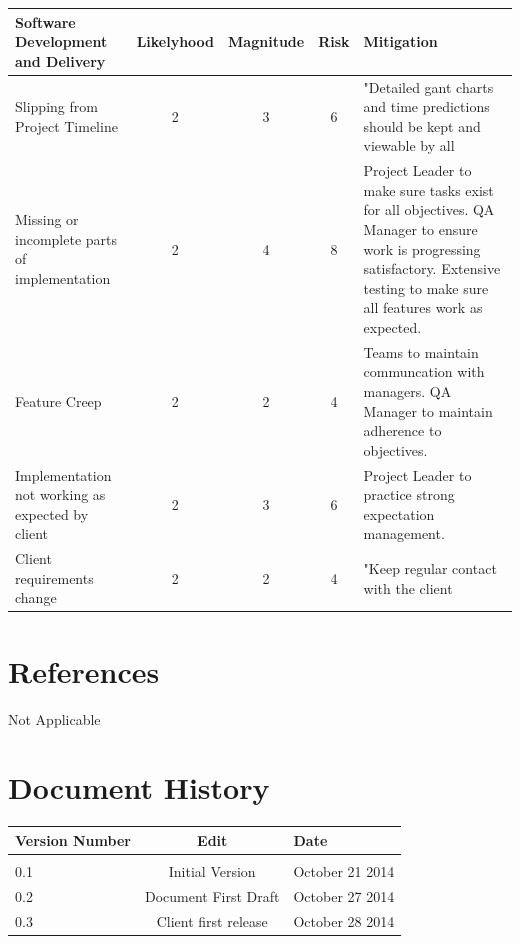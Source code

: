 \documentclass[11pt, titlepage]{article}
\begin{document}
\begin{tabular}[]{| p{3cm} | c | c | c | p{5cm} |}
\hline
\textbf{Software Development and Delivery}&\textbf{Likelyhood}&\textbf{Magnitude}&\textbf{Risk}&\textbf{Mitigation} \\ \hline \hline
Slipping from Project Timeline&2&3&6&"Detailed gant charts and time predictions should be kept and viewable by all\\ \hline
Missing or incomplete parts of implementation&2&4&8&Project Leader to make sure tasks exist for all objectives. QA Manager to ensure work is progressing satisfactory. Extensive testing to make sure all features work as expected. \\ \hline
Feature Creep&2&2&4&Teams to maintain communcation with managers. QA Manager to maintain adherence to objectives. \\ \hline
Implementation not working as expected by client&2&3&6&Project Leader to practice strong expectation management. \\ \hline
Client requirements change&2&2&4&"Keep regular contact with the client\\ \hline

\end{tabular}
\clearpage
	\section{References}
		Not Applicable

	\section{Document History}
		\begin{tabular}{l || c | l}
		Version Number & Edit & Date \\ \hline 
		& & \\
		0.1 & Initial Version & October 21 2014 \\
		0.2 & Document First Draft & October 27 2014 \\
		0.3 & Client first release & October 28 2014 \\
		
		\end{tabular}
\end{document}
